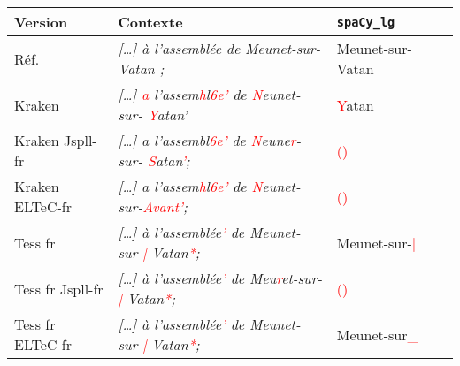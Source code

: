 

\begin{tabular}{|l|l|l|l|}

\hline

\bf{Version} & \bf {Contexte} & \bf{\texttt{spaCy\_lg}}\\
\hline 
Réf.\ & \textit{[\dots]  à l'assemblée de Meunet-sur-Vatan ;} & Meunet-sur-Vatan \\
 Kraken & \textit{[\dots]  \textcolor{red}{a} l'assem\textcolor{red}{h}l\textcolor{red}{6e'} de \textcolor{red}{N}eunet-sur-
\textcolor{red}{Y}atan'}& \textcolor{red}{Y}atan \\ 
 Kraken Jspll-fr &\textit{[\dots]  a l'assembl\textcolor{red}{6e'} de \textcolor{red}{N}eune\textcolor{red}{r}-sur-
\textcolor{red}{S}atan\textcolor{red}{'};}&\textcolor{red}{()} \\
  Kraken ELTeC-fr &\textit{[\dots]  a l'assem\textcolor{red}{h}l\textcolor{red}{6e'} de \textcolor{red}{N}eunet-sur-\textcolor{red}{Avant'};}&\textcolor{red}{()}\\


Tess fr &\textit{[\dots]  à l'assemblée\textcolor{red}{’} de Meunet-sur-\textcolor{red}{|} Vatan\textcolor{red}{*};  }& Meunet-sur-\textcolor{red}{|} \\
Tess fr Jspll-fr&\textit{[\dots]  à l'assemblée\textcolor{red}{’} de Meu\textcolor{red}{r}et-sur-
\textcolor{red}{|} Vatan\textcolor{red}{*};}&\textcolor{red}{()} \\
Tess fr ELTeC-fr& \textit{[\dots]  à l'assemblée\textcolor{red}{’} de Meunet-sur-\textcolor{red}{|} Vatan\textcolor{red}{*};}&Meunet-sur\textcolor{red}{\_}\\
\hline
\end{tabular}



